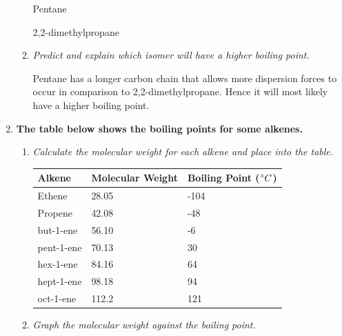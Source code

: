 \documentclass{report}
\begin{document}
\begin{enumerate}
\begin{enumerate}
					Pentane

					\begin{center}
					\end{center}

					2,2-dimethylpropane

					\begin{center}
					\end{center}

				\item \textit{Predict and explain which isomer will have a higher boiling point.}
					
					\subitem Pentane has a longer carbon chain that allows more dispersion forces to occur in comparison to 2,2-dimethylpropane. Hence it will most likely have a higher boiling point.
			\end{enumerate}
		
		\item \textbf{The table below shows the boiling points for some alkenes.}

			\begin{enumerate}
				\item \textit{Calculate the molecular weight for each alkene and place into the table.}

					\begin{table}[H]
						\centering
						\begin{tabular}{p{3cm}|p{4.5cm}|p{4.5cm}}
							\textbf{Alkene}		& \textbf{Molecular Weight}	& \textbf{Boiling Point ($\degree C$)}	\\ \hline
							Ethene			& 28.05				& -104					\\
							Propene			& 42.08				& -48					\\
							but-1-ene		& 56.10				& -6					\\
							pent-1-ene		& 70.13				& 30					\\
							hex-1-ene		& 84.16				& 64					\\
							hept-1-ene		& 98.18				& 94					\\
							oct-1-ene		& 112.2				& 121					\\
						\end{tabular}
					\end{table}

				\item \textit{Graph the molecular weight against the boiling point.}


\end{enumerate}
\end{enumerate}
\end{document}
